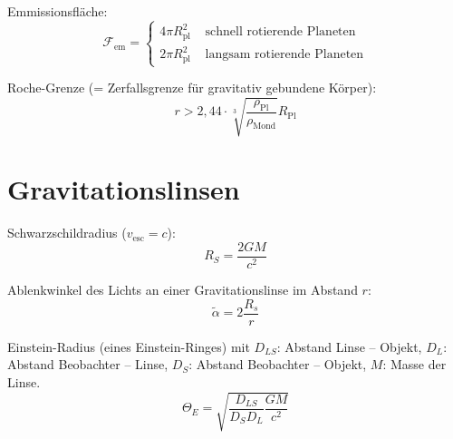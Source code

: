 \documentclass[a4paper,german,12pt,smallheadings,twocolumn]{scrartcl}
\begin{document}
Emmissionsfläche:
\begin{equation}
  \mathcal{F}_\text{em} = \begin{cases}
    4 \pi R_\text{pl}^2 & \text{ schnell rotierende Planeten} \\
    2 \pi R_\text{pl}^2 & \text{ langsam rotierende Planeten}
  \end{cases}
\end{equation}

Roche-Grenze (= Zerfallsgrenze für gravitativ gebundene Körper):
\begin{equation}
  r > 2{,}44 \cdot \sqrt[3]{\frac{\rho_\text{Pl}}{\rho_\text{Mond}}} R_\text{Pl}
\end{equation}

\section*{Gravitationslinsen}
Schwarzschildradius ($v_\text{esc} = c$):
\begin{equation}
  R_S = \frac{2 G M}{c^2}
\end{equation}

Ablenkwinkel des Lichts an einer Gravitationslinse im Abstand $r$:
\begin{equation}
  \widetilde{\alpha} = 2 \frac{R_s}{r}
\end{equation}

Einstein-Radius (eines Einstein-Ringes) mit $D_{LS}$: Abstand Linse -- Objekt,
$D_L$: Abstand Beobachter -- Linse, $D_S$: Abstand Beobachter -- Objekt, $M$:
Masse der Linse.
\begin{equation}
  \Theta_E = \sqrt{\frac{D_{LS}}{D_S D_L} \frac{G M}{c^2}}
\end{equation}
\end{document}
